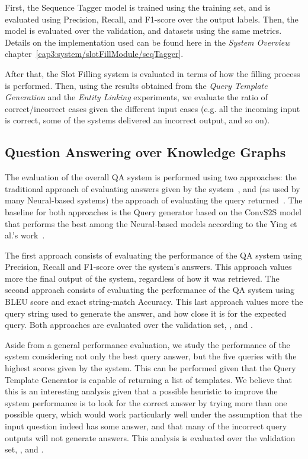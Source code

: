 First, the Sequence Tagger model is trained using the \LCQuADtwo{} training set, and is evaluated 
using Precision, Recall, and F1-score over the output labels. Then, the model is evaluated over 
the \LCQuADtwo{} validation, \QALDseven{} and \WikiSPARQL{} datasets using the same metrics. 
Details on the implementation used can be found here in the \textit{System Overview} 
chapter~\ref{cap3:system/slotFillModule/seqTagger}.

After that, the Slot Filling system is evaluated in terms of how the filling process is performed. 
Then, using the results obtained from the \textit{Query Template Generation} and the 
\textit{Entity Linking} experiments, we evaluate the ratio of correct/incorrect cases given the 
different input cases (e.g. all the incoming input is correct, some of the systems delivered an 
incorrect output, and so on).

\subsection{Question Answering over Knowledge Graphs}
\label{cap4:experimentalDesign/KGQA}
The evaluation of the overall QA system is performed using two approaches: the traditional 
approach of evaluating answers given by the system~\cite{qa:qald-Lopezetal2013}, and (as used by 
many Neural-based systems) the approach of evaluating the \SPARQL{} query 
returned~\cite{nmt:nl-to-sparql-Yin19}. The baseline for both approaches is the \SPARQL{} Query 
generator based on the ConvS2S model that performs the best among the Neural-based models 
according to the Ying et al.’s work~\cite{nmt:nl-to-sparql-Yin19}.

The first approach consists of evaluating the performance of the QA system using Precision, 
Recall and F1-score over the system’s answers. This approach values more the final output of the 
system, regardless of how it was retrieved. The second approach consists of evaluating the 
performance of the QA system using BLEU score and exact string-match Accuracy. This last approach 
values more the query string used to generate the answer, and how close it is for the expected 
query. Both approaches are evaluated over the \LCQuADtwo{} validation set, \QALDseven{}, and \WikiSPARQL{}.

Aside from a general performance evaluation, we study the performance of the system considering 
not only the best \SPARQL{} query answer, but the five \SPARQL{} queries with the highest scores given 
by the system. This can be performed given that the Query Template Generator is capable of 
returning a list of templates. We believe that this is an interesting analysis given that a 
possible heuristic to improve the system performance is to look for the correct answer by trying 
more than one possible \SPARQL{} query, which would work particularly well under the assumption 
that the input question indeed has some answer, and that many of the incorrect \SPARQL{} query 
outputs will not generate answers. This analysis is evaluated over the \LCQuADtwo{} validation set, 
\QALDseven{}, and \WikiSPARQL{}.

